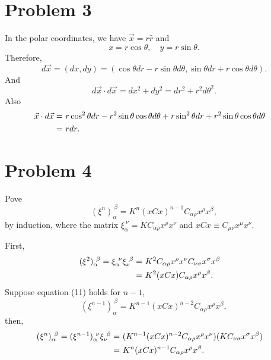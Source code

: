 \documentclass{article}
\begin{document}
\section*{Problem 3}
In the polar coordinates, we have $\vec x = r \hat r$ and
\begin{equation}
x = r \cos \theta, \quad y = r \sin \theta.
\end{equation}
Therefore,
\begin{equation}
    d \vec x = (dx, dy)
    = (\cos \theta dr - r\sin \theta d\theta,
    \sin \theta dr + r \cos \theta d\theta).
\end{equation}
And 
\begin{equation}
    d\vec x \cdot d \vec x = dx^2 + dy^2 = dr^2 + r^2 d \theta^2.
\end{equation}
Also
\begin{align}
   \vec x \cdot d \vec x =&~ r \cos^2 \theta dr 
   - r^2 \sin \theta \cos \theta d\theta
   + r \sin^2 \theta dr 
   + r^2 \sin \theta \cos \theta d\theta\cr
    =& ~r dr.
\end{align}



\section*{Problem 4}
Pove 
\begin{equation}
    (\xi^n)_\alpha^{~\beta} = K^n (x C x)^{n-1} C_{\alpha \rho} x^\rho x^\beta,
\end{equation}
by induction, where the matrix $\xi_\alpha^{~\nu} = K C_{\alpha \rho} x^\rho x^\nu$
and $xCx \equiv C_{\mu \nu} x^\mu x^\nu$.

First,
\begin{align}
    (\xi^2)_\alpha^{~\beta} = \xi_\alpha^{~\nu}\xi_\nu^{~\beta} 
    =&~ K^2 C_{\alpha \rho} x^\rho x^\nu C_{\nu \sigma} x^\sigma x^\beta \cr
    =&~ K^2 (x C x) C_{\alpha \rho} x^\rho x^\beta.
\end{align}
Suppose equation (11) holds for $n-1$,
\begin{equation}
    (\xi^{n-1})_\alpha^{~\beta} = K^{n-1} (x C x)^{n-2} C_{\alpha \rho} x^\rho x^\beta,
\end{equation}
then,
\begin{align}
    (\xi^n)_\alpha^{~\beta} = (\xi ^{n-1})_\alpha^{~\nu} \xi_\nu^{~\beta}
    =&~ (K^{n-1} (x C x)^{n-2} C_{\alpha \rho} x^\rho x^\nu)
    (K C_{\nu \sigma} x^\sigma x^\beta)\cr
    =&~ K^n (x C x)^{n-1} C_{\alpha \rho} x^\rho x^\beta.
\end{align}
\end{document}

